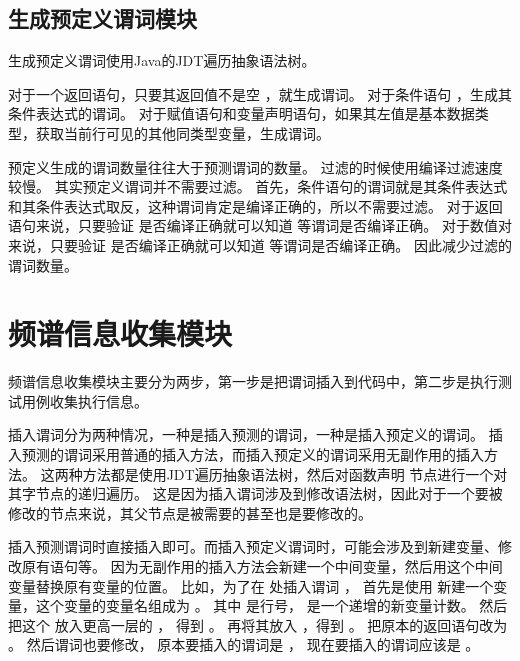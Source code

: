 \subsection{生成预定义谓词模块}

生成预定义谓词使用Java的JDT遍历抽象语法树。

对于一个返回语句，只要其返回值不是空 ，就生成谓词。
对于条件语句 ，生成其条件表达式的谓词。
对于赋值语句和变量声明语句，如果其左值是基本数据类型，获取当前行可见的其他同类型变量，生成谓词。

预定义生成的谓词数量往往大于预测谓词的数量。
过滤的时候使用编译过滤速度较慢。
其实预定义谓词并不需要过滤。
首先，条件语句的谓词就是其条件表达式和其条件表达式取反，这种谓词肯定是编译正确的，所以不需要过滤。
对于返回语句来说，只要验证  是否编译正确就可以知道  等谓词是否编译正确。
对于数值对来说，只要验证  是否编译正确就可以知道  等谓词是否编译正确。
因此减少过滤的谓词数量。

\section{频谱信息收集模块} 

频谱信息收集模块主要分为两步，第一步是把谓词插入到代码中，第二步是执行测试用例收集执行信息。

插入谓词分为两种情况，一种是插入预测的谓词，一种是插入预定义的谓词。
插入预测的谓词采用普通的插入方法，而插入预定义的谓词采用无副作用的插入方法。
这两种方法都是使用JDT遍历抽象语法树，然后对函数声明  节点进行一个对其字节点的递归遍历。
这是因为插入谓词涉及到修改语法树，因此对于一个要被修改的节点来说，其父节点是被需要的甚至也是要修改的。

插入预测谓词时直接插入即可。而插入预定义谓词时，可能会涉及到新建变量、修改原有语句等。
因为无副作用的插入方法会新建一个中间变量，然后用这个中间变量替换原有变量的位置。
比如，为了在  处插入谓词 ，
首先是使用  新建一个变量，这个变量的变量名组成为
。
其中  是行号，  是一个递增的新变量计数。
然后把这个  放入更高一层的  ，
得到 。
再将其放入 ，得到 。
把原本的返回语句改为 。
然后谓词也要修改，
原本要插入的谓词是 ，
现在要插入的谓词应该是 。

